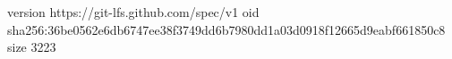 version https://git-lfs.github.com/spec/v1
oid sha256:36be0562e6db6747ee38f3749dd6b7980dd1a03d0918f12665d9eabf661850c8
size 3223
